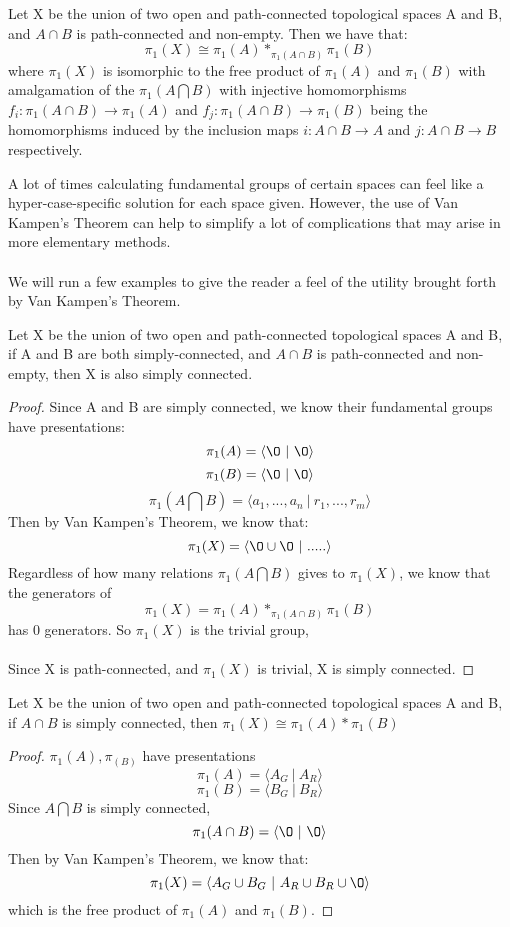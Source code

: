 \begin{theorem} Let X be the union of two open and path-connected topological spaces A and B, and $A \cap B$ is path-connected and non-empty. Then we have that:
\[\pi_1(X) \cong \pi_1(A) *_{\pi_1(A \cap B)} \pi_1(B)\]
where $\pi_1(X)$ is isomorphic to the free product of $\pi_1(A)$ and $\pi_1(B)$ with amalgamation of the $\pi_1(A \bigcap B)$ with injective homomorphisms $f_i: \pi_1(A \cap B) \to \pi_1(A)$ and $f_j: \pi_1(A \cap B) \to \pi_1(B)$ being the homomorphisms induced by the inclusion maps $i: A \cap B \to A$ and $j: A \cap B \to B$ respectively.
\end{theorem}
\noindent A lot of times calculating fundamental groups of certain spaces can feel like a hyper-case-specific solution for each space given. However, the use of Van Kampen's Theorem can help to simplify a lot of complications that may arise in more elementary methods.\\\\
We will run a few examples to give the reader a feel of the utility brought forth by Van Kampen's Theorem.
\begin{example}
Let X be the union of two open and path-connected topological spaces A and B, if A and B are both simply-connected, and $A \cap B$ is path-connected and non-empty, then X is also simply connected.
\begin{proof}
Since A and B are simply connected, we know their fundamental groups have presentations:
\[\pi_1(A) = \langle \O\ |\ \O\rangle\]
\[\pi_1(B) = \langle \O\ |\ \O\rangle\]
\[\pi_1(A \bigcap B) = \langle a_1, ..., a_n\ |\ r_1, ..., r_m\rangle\]
Then by Van Kampen's Theorem, we know that:
\[\pi_1(X) = \langle \O \cup \O\ |\ .....\rangle\]
Regardless of how many relations $\pi_1(A \bigcap B)$ gives to $\pi_1(X)$, we know that the generators of $$\pi_1(X) = \pi_1(A) *_{\pi_1(A \cap B)} \pi_1(B)$$ has 0 generators. So $\pi_1(X)$ is the trivial group,\\\\
Since X is path-connected, and $\pi_1(X)$ is trivial, X is simply connected.
\end{proof}
\end{example}

\begin{example}
Let X be the union of two open and path-connected topological spaces A and B, if $A \cap B$ is simply connected, then $\pi_1(X) \cong \pi_1(A)*\pi_1(B)$
\begin{proof}
$\pi_1(A), \pi_(B)$ have presentations
\[\pi_1(A) = \langle A_G\ |\ A_R\rangle\]
\[\pi_1(B) = \langle B_G\ |\ B_R\rangle\]
Since $A \bigcap B$ is simply connected, 
\[\pi_1(A \cap B) = \langle \O\ |\ \O\rangle\]
Then by Van Kampen's Theorem, we know that:
\[\pi_1(X) = \langle A_G \cup B_G\ |\ A_R \cup B_R \cup \O\rangle\]
which is the free product of $\pi_1(A)$ and $\pi_1(B)$.
\end{proof}
\end{example}

